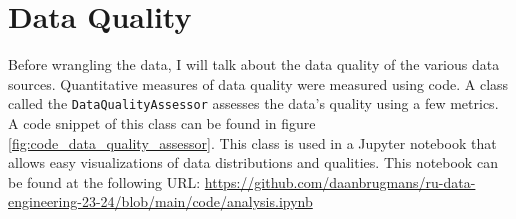 \documentclass[sigconf, natbib=true]{acmart}
\begin{document}

\section{Data Quality}
Before wrangling the data, I will talk about the data quality of the various data sources.
Quantitative measures of data quality were measured using code.
A class called the \texttt{DataQualityAssessor} assesses the data's quality using a few metrics.
A code snippet of this class can be found in figure \ref{fig:code_data_quality_assessor}.
This class is used in a Jupyter notebook that allows easy visualizations of data distributions and qualities.
This notebook can be found at the following URL: \url{https://github.com/daanbrugmans/ru-data-engineering-23-24/blob/main/code/analysis.ipynb}
\end{document}
